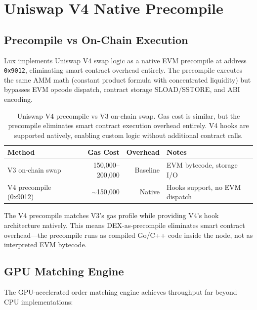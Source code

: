 \section{Uniswap V4 Native Precompile}


\subsection{Precompile vs On-Chain Execution}

Lux implements Uniswap V4 swap logic as a native EVM precompile at address
\texttt{0x9012}, eliminating smart contract overhead entirely. The precompile
executes the same AMM math (constant product formula with concentrated liquidity)
but bypasses EVM opcode dispatch, contract storage SLOAD/SSTORE, and ABI encoding.

\begin{table}[h]
\centering
\begin{tabular}{lrrl}
\toprule
\textbf{Method} & \textbf{Gas Cost} & \textbf{Overhead} & \textbf{Notes} \\
\midrule
V3 on-chain swap         & 150{,}000--200{,}000 & Baseline & EVM bytecode, storage I/O \\
V4 precompile (0x9012)   & $\sim$150{,}000      & Native   & Hooks support, no EVM dispatch \\
\bottomrule
\end{tabular}
\caption{Uniswap V4 precompile vs V3 on-chain swap. Gas cost is similar, but the
precompile eliminates smart contract execution overhead entirely. V4 hooks are
supported natively, enabling custom logic without additional contract calls.}
\end{table}

The V4 precompile matches V3's gas profile while providing V4's hook architecture
natively. This means DEX-as-precompile eliminates smart contract overhead---the
precompile runs as compiled Go/C++ code inside the node, not as interpreted EVM
bytecode.

\subsection{GPU Matching Engine}

The GPU-accelerated order matching engine achieves throughput far beyond CPU
implementations:


